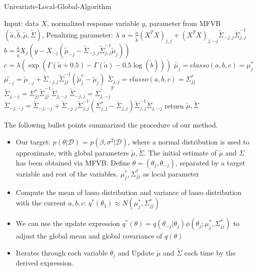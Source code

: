 \newpage
\begin{algorithm}
	\caption{Univariate-Local-Global-Algorithm}
	\begin{algorithmic}[1]
		
    \State Input: data $X$, normalized response variable $y$, parameter from MFVB $(\tilde{a},\tilde{b},\tilde{\mu},\tilde{\Sigma})$, Penalizing parameter: $\lambda$
	\State $a = \frac{\tilde{a}}{\tilde{b}}(X^TX)_{j,j} + (X^TX)_{j,-j}\tilde{\Sigma}_{-j,j}\tilde{\Sigma}_{j,j}^{-1}$ 
	\State $b = \frac{\tilde{a}}{\tilde{b}}  X_{j}(y-X_{-j}(\tilde{\mu}_{-j} - \tilde{\Sigma}_{-j,j}\tilde{\Sigma}_{j,j}^{-1}\tilde{\mu}_j))       $ 
	\State $c = \lambda (\exp(\Gamma(\tilde{a}+0.5) - \Gamma(\tilde{a}) - 0.5\log(\tilde{b})))  $ 
	\State $\tilde{\mu_{j}} =  elasso(a,b,c) = \mu_j ^*$ 
	\State $\tilde{\mu_{-j}} = \tilde{\mu}_{-j} +  \tilde{\Sigma}_{-j,j}\tilde{\Sigma}^{-1}_{jj}(\tilde{\mu}_j^*-\tilde{\mu}_j)$ 
	\State $\tilde{\Sigma}_{j,j} = vlasso(a,b,c) = \Sigma_{jj}^*$ 
	\State $\tilde{\Sigma}_{j,-j} = \Sigma_{jj}^*  \tilde{\Sigma}_{jj}^{-1}\tilde{\Sigma}_{j,-j} $ 
	\State $\tilde{\Sigma}_{-j,j} = \tilde{\Sigma_{j,-j}}^T$ 
	\State $\tilde{\Sigma}_{-j,-j} = \tilde{\Sigma}_{-j,-j} + \tilde{\Sigma}_{-j,j}\tilde{\Sigma}_{j,j}^{-1}(\Sigma_{j,j}^{*} - \tilde{\Sigma}_{j,j})\tilde{\Sigma}_{j,j}^{-1}\tilde{\Sigma}_{j,-j}$ 		
	\EndFor
	\EndWhile
	\State return $\tilde{\mu},\tilde{\Sigma}$
		
		
		
	\end{algorithmic}
\end{algorithm}
The following bullet points summarized the procedure of our method.
\begin{itemize}
	\item Our target: $p(\theta|\mathcal{D})$ = $p(\beta, \sigma^2|\mathcal{D})$, where a normal distribution is used to approximate, with global parameters $\tilde{\mu},\tilde{\Sigma}$. The initial estimate of $\tilde{\mu}$ and $\Sigma$ has been obtained via MFVB. Define $\theta = (\theta_j,\theta_{-j})$, separated by a target variable and rest of the variables. $\mu_{j}^*, \Sigma_{jj}^*$ as local parameter
	
	
	\item Compute the mean of lasso distribution and variance of lasso distribution with the current $a,b,c$: $q^*(\theta_1) \approx N(\mu_j^*,\Sigma_{jj}^*)$
	\item We can use the update expression $q^*(\theta) = q(\theta_{-j}|\theta_j)\phi(\theta_j;\mu_j^*,\Sigma_{jj}^*)$ to adjust the global mean and global covariance of $q(\theta)$
	\item Iterates through each variable $\theta_j$ and Update $\tilde{\mu}$ and $\tilde{\Sigma}$ each time by the derived expression.
\end{itemize}

